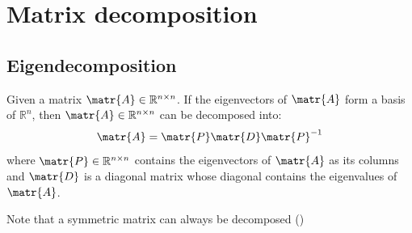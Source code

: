 \chapter{Matrix decomposition}


\section{Eigendecomposition}
Given a matrix $\matr{A} \in \mathbb{R}^{n \times n}$.
If the eigenvectors of $\matr{A}$ form a basis of $\mathbb{R}^n$,
then $\matr{A} \in \mathbb{R}^{n \times n}$ can be decomposed into:
\[ \matr{A} = \matr{P}\matr{D}\matr{P}^{-1} \]
where $\matr{P} \in \mathbb{R}^{n \times n}$ contains the eigenvectors of $\matr{A}$ as its columns and 
$\matr{D}$ is a diagonal matrix whose diagonal contains the eigenvalues of $\matr{A}$.

Note that a symmetric matrix can always be decomposed ()



